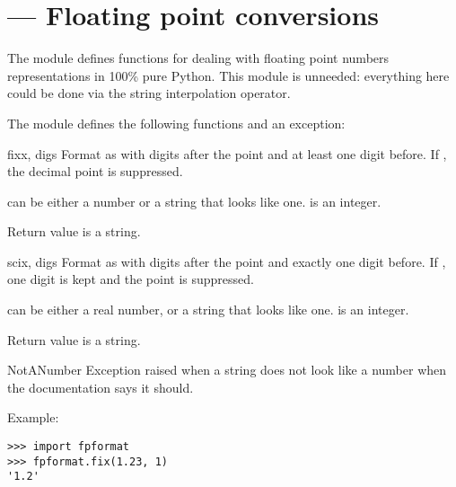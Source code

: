 \section{ ---
         Floating point conversions}



The  module defines functions for dealing with
floating point numbers representations in 100\% pure
Python.   This module is unneeded: everything here could
be done via the \code{\%} string interpolation operator.

The  module defines the following functions and an
exception:


\begin{funcdesc}{fix}{x, digs}
Format  as  with  digits after the
point and at least one digit before.
If , the decimal point is suppressed.

 can be either a number or a string that looks like
one.  is an integer.

Return value is a string.
\end{funcdesc}

\begin{funcdesc}{sci}{x, digs}
Format  as  with  digits after the 
point and exactly one digit before.
If , one digit is kept and the point is suppressed.

 can be either a real number, or a string that looks like
one.  is an integer.

Return value is a string.
\end{funcdesc}

\begin{excdesc}{NotANumber}
Exception raised when a string does not look like a number when the 
documentation says it should.
\end{excdesc}

Example:

\begin{verbatim}
>>> import fpformat
>>> fpformat.fix(1.23, 1)
'1.2'
\end{verbatim}
